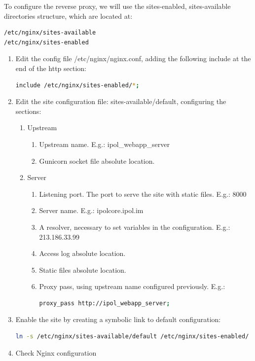To configure the reverse proxy, we will use the sites-enabled, sites-available directories structure, which are located at:
\begin{lstlisting}[language=Bash]
/etc/nginx/sites-available
/etc/nginx/sites-enabled
\end{lstlisting}

\begin{enumerate}
\item Edit the config file /etc/nginx/nginx.conf, adding the following include at the end of the http section:
\begin{lstlisting}[language=Bash]
include /etc/nginx/sites-enabled/*;
\end{lstlisting}
\item Edit the site configuration file: sites-available/default, configuring the sections:
\begin{enumerate}
\item Upstream
\begin{enumerate}
\item Upstream name. E.g.: ipol\_webapp\_server
\item Gunicorn socket file absolute location.
\end{enumerate}
\item Server
\begin{enumerate}
\item Listening port. The port to serve the site with static files. E.g.: 8000
\item Server name. E.g.: ipolcore.ipol.im
\item A resolver, necessary to set variables in the configuration. E.g.: 213.186.33.99
\item Access log absolute location.
\item Static files absolute location.
\item Proxy pass, using upstream name configured previously.
E.g.:
\begin{lstlisting}[language=Bash]
proxy_pass http://ipol_webapp_server;
\end{lstlisting}

\end{enumerate}
\end{enumerate}
\item Enable the site by creating a symbolic link to default configuration:
\begin{lstlisting}[language=Bash]
ln -s /etc/nginx/sites-available/default /etc/nginx/sites-enabled/
\end{lstlisting}
\item Check Nginx configuration
\begin{lstlisting}[language=Bash]

\end{lstlisting}
\end{enumerate}


